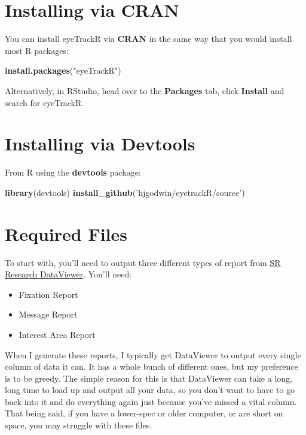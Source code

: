 \documentclass[]{book}
\newenvironment{Shaded}{\begin{snugshade}}{\end{snugshade}}
\newcommand{\KeywordTok}[1]{\textcolor[rgb]{0.13,0.29,0.53}{\textbf{#1}}}
\newcommand{\NormalTok}[1]{#1}
\newcommand{\StringTok}[1]{\textcolor[rgb]{0.31,0.60,0.02}{#1}}
\providecommand{\tightlist}{%
  \setlength{\itemsep}{0pt}\setlength{\parskip}{0pt}}
\begin{document}
\hypertarget{installing-via-cran}{%
\section{Installing via CRAN}\label{installing-via-cran}}

You can install eyeTrackR via \textbf{CRAN} in the same way that you would install most R packages:

\begin{Shaded}
\begin{Highlighting}[]
\KeywordTok{install.packages}\NormalTok{(}\StringTok{"eyeTrackR"}\NormalTok{)}
\end{Highlighting}
\end{Shaded}

Alternatively, in RStudio, head over to the \textbf{Packages} tab, click \textbf{Install} and search for eyeTrackR.

\hypertarget{installing-via-devtools}{%
\section{Installing via Devtools}\label{installing-via-devtools}}

From R using the \textbf{devtools} package:

\begin{Shaded}
\begin{Highlighting}[]
\KeywordTok{library}\NormalTok{(devtools)}
\KeywordTok{install_github}\NormalTok{(}\StringTok{'hjgodwin/eyetrackR/source'}\NormalTok{)}
\end{Highlighting}
\end{Shaded}

\hypertarget{required-files}{%
\section{Required Files}\label{required-files}}

To start with, you'll need to output three different types of report from \href{https://www.sr-research.com/data-viewer/}{SR Research DataViewer}. You'll need:

\begin{itemize}
\tightlist
\item
  Fixation Report
\item
  Message Report
\item
  Interest Area Report
\end{itemize}

When I generate these reports, I typically get DataViewer to output every single column of data it can. It has a whole bunch of different ones, but my preference is to be greedy. The simple reason for this is that DataViewer can take a long, long time to load up and output all your data, so you don't want to have to go back into it and do everything again just because you've missed a vital column. That being said, if you have a lower-spec or older computer, or are short on space, you may struggle with these files.
\end{document}
